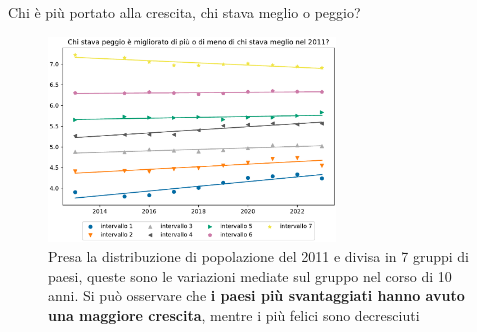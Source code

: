 \documentclass{beamer}
\begin{document}
\begin{frame}{Chi è più portato alla crescita, chi stava meglio o peggio?}
	\begin{figure}
		\centering
		\includegraphics[width=0.68\textwidth]{"./img/7ImmobilismoOVariazioneBenessere.pdf"}
		\caption{Presa la distribuzione di popolazione del 2011 e divisa in 7 gruppi di paesi, queste sono le variazioni mediate sul gruppo nel corso di 10 anni. Si può osservare che \textbf{i paesi più svantaggiati hanno avuto una maggiore crescita}, mentre i più felici sono decresciuti}
	\end{figure}
\end{frame}
\end{document}
